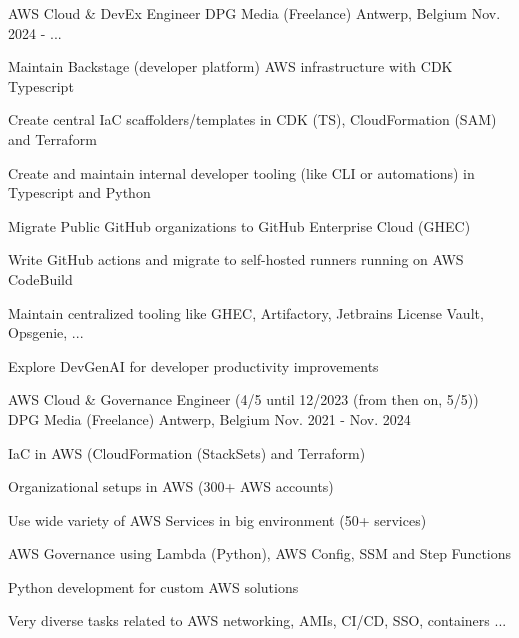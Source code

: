 

\begin{cventries}
  \cventry
    {AWS Cloud \& DevEx Engineer} %
    {DPG Media (Freelance)} %
    {Antwerp, Belgium} %
    {Nov. 2024 - ...} %
    {
      \begin{cvitems} %
        \item {Maintain Backstage (developer platform) AWS infrastructure with CDK Typescript}
        \item {Create central IaC scaffolders/templates in CDK (TS), CloudFormation (SAM) and Terraform}
        \item {Create and maintain internal developer tooling (like CLI or automations) in Typescript and Python}
        \item {Migrate Public GitHub organizations to GitHub Enterprise Cloud (GHEC)}       
        \item {Write GitHub actions and migrate to self-hosted runners running on AWS CodeBuild}
        \item {Maintain centralized tooling like GHEC, Artifactory, Jetbrains License Vault, Opsgenie, ...}
        \item {Explore DevGenAI for developer productivity improvements}
      \end{cvitems}
    }

  \cventry
    {AWS Cloud \& Governance Engineer (4/5 until 12/2023 (from then on, 5/5))} %
    {DPG Media (Freelance)} %
    {Antwerp, Belgium} %
    {Nov. 2021 - Nov. 2024} %
    {
      \begin{cvitems} %
        \item {IaC in AWS (CloudFormation (StackSets) and Terraform)}
        \item {Organizational setups in AWS (300+ AWS accounts)}
        \item {Use wide variety of AWS Services in big environment (50+ services)}
        \item {AWS Governance using Lambda (Python), AWS Config, SSM and Step Functions}
        \item {Python development for custom AWS solutions}       
        \item {Very diverse tasks related to AWS networking, AMIs, CI/CD, SSO, containers ...}
      \end{cvitems}
    }


\end{cventries}
